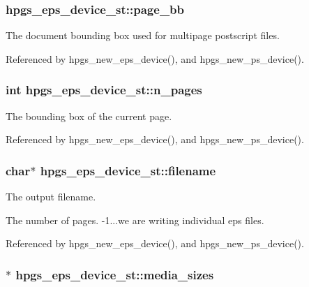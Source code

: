 \subsubsection[page\_\-bb]{ {\bf hpgs\_\-eps\_\-device\_\-st::page\_\-bb}}\label{structhpgs__eps__device__st_2c98ad0814627f9480f283aa2754a181}


The document bounding box used for multipage postscript files. 

Referenced by hpgs\_\-new\_\-eps\_\-device(), and hpgs\_\-new\_\-ps\_\-device().
\subsubsection[n\_\-pages]{\setlength{\rightskip}{0pt plus 5cm}int {\bf hpgs\_\-eps\_\-device\_\-st::n\_\-pages}}\label{structhpgs__eps__device__st_00716a164dab36095ca4daba2ff43fc4}


The bounding box of the current page. 

Referenced by hpgs\_\-new\_\-eps\_\-device(), and hpgs\_\-new\_\-ps\_\-device().
\subsubsection[filename]{\setlength{\rightskip}{0pt plus 5cm}char$\ast$ {\bf hpgs\_\-eps\_\-device\_\-st::filename}}\label{structhpgs__eps__device__st_9852d09a4f1530b05fb1bc4d64912f4b}


The output filename. 

The number of pages. -1...we are writing individual eps files. 

Referenced by hpgs\_\-new\_\-eps\_\-device(), and hpgs\_\-new\_\-ps\_\-device().
\subsubsection[media\_\-sizes]{$\ast$ {\bf hpgs\_\-eps\_\-device\_\-st::media\_\-sizes}}\label{structhpgs__eps__device__st_578308a5c4ae9cec6a37d3e8c85ebc09}


